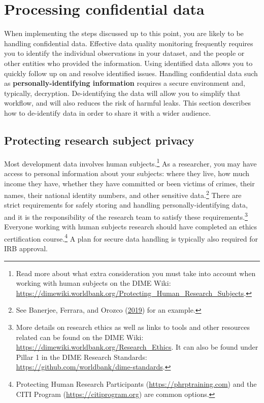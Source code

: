 \documentclass[
]{book}
\begin{document}
\hypertarget{processing-confidential-data}{%
\section*{Processing confidential data}\label{processing-confidential-data}}

When implementing the steps discussed up to this point,
you are likely to be handling confidential data.
Effective data quality monitoring
frequently requires you to identify the individual observations in your dataset,
and the people or other entities who provided the information.
Using identified data allows you to quickly follow up on and resolve identified issues.
Handling confidential data such as
\textbf{personally-identifying information}
requires a secure environment and, typically, decryption.
De-identifying the data will allow you to simplify that workflow,
and will also reduces the risk of harmful leaks.
This section describes how to de-identify data in order to share it with a wider audience.

\hypertarget{protecting-research-subject-privacy}{%
\subsection*{Protecting research subject privacy}\label{protecting-research-subject-privacy}}

Most development data involves human subjects.\footnote{Read more about what extra consideration
  you must take into account when
  working with human subjects on the DIME Wiki:
  \url{https://dimewiki.worldbank.org/Protecting_Human_Research_Subjects}.}
As a researcher, you may have access to personal information about your subjects:
where they live, how much income they have,
whether they have committed or been victims of crimes,
their names, their national identity numbers, and other sensitive data.\footnote{See Banerjee, Ferrara, and Orozco (\protect\hyperlink{ref-banerjee2019entertainment}{2019}) for an example.}
There are strict requirements for safely storing and handling personally-identifying data,
and it is the responsibility of the research team to satisfy these requirements.\footnote{More details on research ethics as well as links to tools and
  other resources related can be found on the DIME Wiki:
  \url{https://dimewiki.worldbank.org/Research_Ethics}.
  It can also be found under Pillar 1 in the DIME Research Standards:
  \url{https://github.com/worldbank/dime-standards}.}
Everyone working with human subjects research should
have completed an ethics certification course.\footnote{Protecting Human Research Participants (\url{https://phrptraining.com})
  and the CITI Program (\url{https://citiprogram.org})
  are common options.}
A plan for secure data handling is typically also required for IRB approval.
\end{document}
